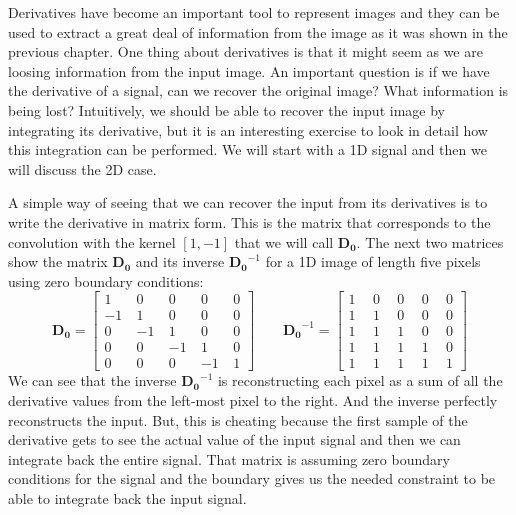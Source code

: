 Derivatives have become an important tool to represent images and they can be used to extract a great deal of information from the image as it was shown in the previous chapter. One thing about derivatives is that it might seem as we are loosing information from the input image. An important question is if we have the derivative of a signal, can we recover the original image? What information is being lost? Intuitively, we should be able to recover the input image by integrating its derivative, but it is an interesting exercise to look in detail how this integration can be performed. We will start with a 1D signal and then we will discuss the 2D case.

A simple way of seeing that we can recover the input from its derivatives is to write the derivative in matrix form. This is the matrix that corresponds to the convolution with the kernel $\left[1, -1 \right]$ that we will call $\mathbf{D_0}$. The next two matrices show the matrix $\mathbf{D_0}$ and its inverse $\mathbf{D_0}^{-1}$ for a 1D image of length five pixels using zero boundary conditions:
\begin{equation}
\mathbf{D_0} = 
\begin{bmatrix}
  1 ~& 0 ~& 0 ~& 0~& 0 \\
  -1 ~& 1 ~& 0 ~& 0~& 0 \\
  0 ~& -1 ~& 1 ~& 0 ~& 0\\
  0~& 0 ~& -1 ~& 1 ~& 0\\
  0~& 0 ~& 0 ~& -1 ~& 1
 \end{bmatrix}
 ~~~~~~~~~
\mathbf{D_0}^{-1} = 
\begin{bmatrix}
  1 ~&~ 0 ~&~ 0 ~&~ 0~&~ 0 \\
  1 ~&~ 1 ~&~ 0 ~&~ 0~&~ 0 \\
  1 ~&~ 1 ~&~ 1 ~&~ 0 ~&~ 0\\
  1~&~ 1 ~&~ 1 ~&~ 1 ~&~ 0\\
  1~&~ 1 ~&~ 1 ~&~ 1 ~&~ 1
 \end{bmatrix}
\end{equation}
We can see that the inverse $\mathbf{D_0}^{-1}$ is reconstructing each pixel as a sum of all the derivative values from the left-most pixel to the right.  And the inverse perfectly reconstructs the input. But, this is cheating because the first sample of the derivative gets to see the actual value of the input signal and then we can integrate back the entire signal. That matrix is assuming zero boundary conditions for the signal and the boundary gives us the needed constraint to be able to integrate back the input signal. 

